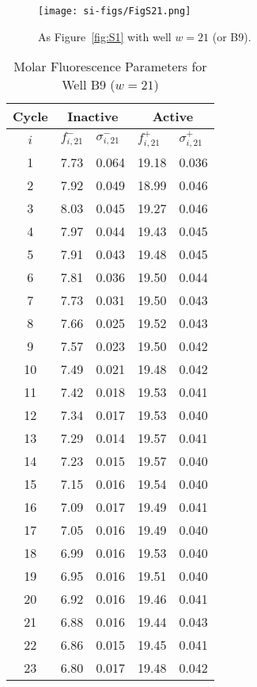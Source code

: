                 \begin{figure}
                    \centering
                    \texttt{[image: si-figs/FigS21.png]}
                    \caption{
                        As Figure~\ref{fig:S1} with well $w=21$ (or B9).
                    }
                \end{figure}
                \clearpage
    \begin{table}
        \caption{Molar Fluorescence Parameters for Well B9 ($w=21$)}
        \centering
        \begin{tabular}{c|ll|ll}
            Cycle & \multicolumn{2}{c|}{Inactive} & \multicolumn{2}{c}{Active} \\
            \hline
            $i$ & $f_{i,21}^{-}$ & $\sigma_{i,21}^{-}$ &  $f_{i,21}^{+}$ & $\sigma_{i,21}^{+}$ \\
            \hline
    1 & 7.73 & 0.064 & 19.18 & 0.036 \\
2 & 7.92 & 0.049 & 18.99 & 0.046 \\
3 & 8.03 & 0.045 & 19.27 & 0.046 \\
4 & 7.97 & 0.044 & 19.43 & 0.045 \\
5 & 7.91 & 0.043 & 19.48 & 0.045 \\
6 & 7.81 & 0.036 & 19.50 & 0.044 \\
7 & 7.73 & 0.031 & 19.50 & 0.043 \\
8 & 7.66 & 0.025 & 19.52 & 0.043 \\
9 & 7.57 & 0.023 & 19.50 & 0.042 \\
10 & 7.49 & 0.021 & 19.48 & 0.042 \\
11 & 7.42 & 0.018 & 19.53 & 0.041 \\
12 & 7.34 & 0.017 & 19.53 & 0.040 \\
13 & 7.29 & 0.014 & 19.57 & 0.041 \\
14 & 7.23 & 0.015 & 19.57 & 0.040 \\
15 & 7.15 & 0.016 & 19.54 & 0.040 \\
16 & 7.09 & 0.017 & 19.49 & 0.041 \\
17 & 7.05 & 0.016 & 19.49 & 0.040 \\
18 & 6.99 & 0.016 & 19.53 & 0.040 \\
19 & 6.95 & 0.016 & 19.51 & 0.040 \\
20 & 6.92 & 0.016 & 19.46 & 0.041 \\
21 & 6.88 & 0.016 & 19.44 & 0.043 \\
22 & 6.86 & 0.015 & 19.45 & 0.041 \\
23 & 6.80 & 0.017 & 19.48 & 0.042 \\

\end{tabular}
\end{table}

